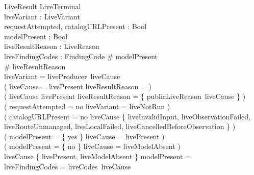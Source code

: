 \documentclass{article}
\begin{document}

\begin{schema}{LiveResult}
	LiveTerminal \\
	liveVariant : LiveVariant \\
	requestAttempted, catalogURLPresent : Bool \\
	modelPresent : \power Bool \\
	liveResultReason : \power LiveReason \\
	liveFindingCodes : \power FindingCode
	\where
	\# modelPresent  \\
	\# liveResultReason  \\
	liveVariant = liveProducer~liveCause \\
	( liveCause = livePresent \iff liveResultReason = \emptyset ) \\
	( liveCause \neq livePresent \implies
	liveResultReason = \{ publicLiveReason~liveCause \} ) \\
	( requestAttempted = no \iff liveVariant = liveNotRun ) \\
	( catalogURLPresent = no \iff liveCause \in
	\{ liveInvalidInput, liveObservationFailed, liveRouteUnmanaged,
	liveLocalFailed, liveCancelledBeforeObservation \} ) \\
	( modelPresent = \{ yes \} \iff liveCause = livePresent ) \\
	( modelPresent = \{ no \} \iff liveCause = liveModelAbsent ) \\
	liveCause \notin \{ livePresent, liveModelAbsent \} \implies
	modelPresent = \emptyset \\
	liveFindingCodes = liveCodes~liveCause
\end{schema}
\end{document}
